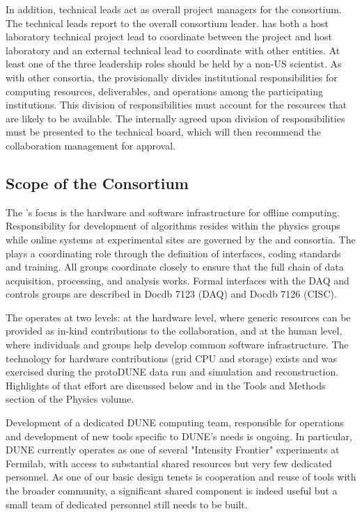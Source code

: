 In addition, technical leads act as overall project managers for the consortium. The technical leads report to the overall consortium leader.
 has both a host laboratory technical project lead to coordinate between the  project and host laboratory and an external technical lead to coordinate with other entities.
At least one of the three leadership roles should be held by a non-US scientist. 
As with other  consortia, the  provisionally divides institutional
responsibilities for computing resources, deliverables, and operations among the participating institutions. This division of responsibilities must account for the resources that are likely to be available. The internally agreed upon division of responsibilities must be presented to the technical board, which will then recommend the collaboration management for approval.


\subsection{Scope of the Consortium}
The 's focus is the hardware and software infrastructure  for offline computing.  Responsibility for development of algorithms  resides within the physics groups while online systems at experimental sites are governed by the  and  consortia. The  plays a coordinating role through the definition of interfaces, coding standards and training. All groups coordinate closely to ensure that the full chain of data acquisition, processing, and analysis works. Formal interfaces with the DAQ and controls groups are described in Docdb 7123 (DAQ)\cite{bib:docdb7123} and Docdb 7126 (CISC)\cite{bib:docdb7126}.

The  operates at two levels: at the hardware level, where generic resources can be provided as in-kind contributions to the collaboration, and at the human level, where individuals and groups help develop common software infrastructure.  The   technology for hardware contributions (grid CPU and storage) exists and was exercised during the protoDUNE data run and simulation and reconstruction. Highlights of that effort are discussed below and in the Tools and Methods section of the Physics volume.  

Development of a  dedicated DUNE computing team, responsible for operations and development of new tools specific to DUNE's needs is ongoing. In particular, DUNE currently operates as one of several "Intensity Frontier" experiments at Fermilab, with access to substantial shared resources but very few dedicated personnel.  As one of our basic design tenets is cooperation and reuse of tools with the broader community, a significant shared component is indeed useful but a small team of dedicated personnel still needs to be built. 

